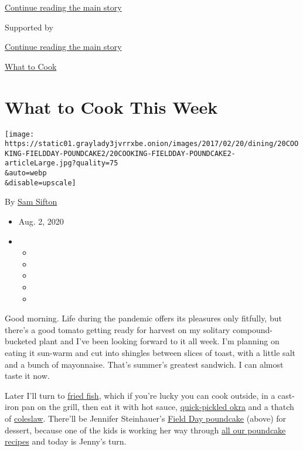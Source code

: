 \protect\hyperlink{after-top}{Continue reading the main story}

Supported by

\protect\hyperlink{after-sponsor}{Continue reading the main story}

\href{/column/what-to-cook}{What to Cook}

\hypertarget{what-to-cook-this-week}{%
\section{What to Cook This Week}\label{what-to-cook-this-week}}

\texttt{[image: https://static01.graylady3jvrrxbe.onion/images/2017/02/20/dining/20COOKING-FIELDDAY-POUNDCAKE2/20COOKING-FIELDDAY-POUNDCAKE2-articleLarge.jpg?quality=75\\\&auto=webp\\\&disable=upscale]}

By \href{https://www.nytimes3xbfgragh.onion/by/sam-sifton}{Sam Sifton}

\begin{itemize}
\item
  Aug. 2, 2020
\item
  \begin{itemize}
  \item
  \item
  \item
  \item
  \item
  \end{itemize}
\end{itemize}

Good morning. Life during the pandemic offers its pleasures only
fitfully, but there's a good tomato getting ready for harvest on my
solitary compound-bucketed plant and I've been looking forward to it all
week. I'm planning on eating it sun-warm and cut into shingles between
slices of toast, with a little salt and a bunch of mayonnaise. That's
summer's greatest sandwich. I can almost taste it now.

Later I'll turn to
\href{https://cooking.nytimes3xbfgragh.onion/recipes/1014786-outdoor-fish-fry}{fried
fish}, which if you're lucky you can cook outside, in a cast-iron pan on
the grill, then eat it with hot sauce,
\href{https://cooking.nytimes3xbfgragh.onion/recipes/1021260-quick-pickled-okra}{quick-pickled
okra} and a thatch of
\href{https://cooking.nytimes3xbfgragh.onion/recipes/1014788-simple-slaw}{coleslaw}.
There'll be Jennifer Steinhauer's
\href{https://cooking.nytimes3xbfgragh.onion/recipes/12194-field-day-poundcake}{Field
Day poundcake} (above) for dessert, because one of the kids is working
her way through
\href{https://cooking.nytimes3xbfgragh.onion/search?q=poundcake}{all our
poundcake recipes} and today is Jenny's turn.

